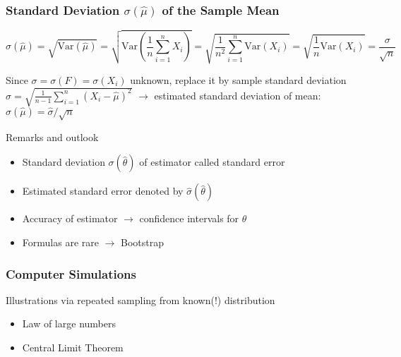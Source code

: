 \begin{frame}
	\frametitle{Standard Deviation $\sigma(\hat\mu)$ of the Sample Mean}
	$$
	  \sigma(\hat\mu) = \sqrt{\text{Var}(\hat\mu)} = \sqrt{\text{Var}\left(\frac{1}{n} \sum_{i = 1}^n X_i\right)} = \sqrt{\frac{1}{n^2} \sum_{i = 1}^n \text{Var}(X_i)} = \sqrt{\frac{1}{n} \text{Var}(X_i)} = \frac{\sigma}{\sqrt{n}}
	$$
	
	\vfill
	
	Since $\sigma = \sigma(F) = \sigma(X_i)$ unknown, replace it by \alert{sample} standard deviation
	$
	  \hat\sigma = \sqrt{\frac{1}{n-1}\sum_{i = 1}^{n}(X_i - \hat\mu)^2}
	$
	$\rightarrow$ estimated standard deviation of mean: $\hat\sigma(\hat\mu) = \hat\sigma / \sqrt{n}$
	
	\vfill
	
	\begin{block}{Remarks and outlook}
		\begin{itemize}
			\item Standard deviation $\sigma(\hat\theta)$ of estimator called \alert{standard error}
			\item \alert{Estimated} standard error denoted by $\hat\sigma(\hat\theta)$
			\item Accuracy of estimator $\rightarrow$ confidence intervals for $\theta$
			\item Formulas are rare $\rightarrow$ Bootstrap
		\end{itemize}
	\end{block}
\end{frame}

\begin{frame}
	\frametitle{Computer Simulations}
	\begin{exampleblock}{Illustrations via repeated sampling from known(!) distribution}
		\begin{itemize}
			\item Law of large numbers
			\item Central Limit Theorem
		\end{itemize}
	\end{exampleblock}
\end{frame}

